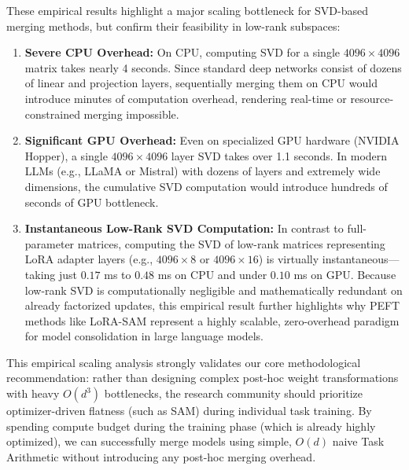 \documentclass{article}
\theoremstyle{plain}
\theoremstyle{definition}
\theoremstyle{remark}
\begin{document}
These empirical results highlight a major scaling bottleneck for SVD-based merging methods, but confirm their feasibility in low-rank subspaces:
\begin{enumerate}
  \item \textbf{Severe CPU Overhead:} On CPU, computing SVD for a single $4096 \times 4096$ matrix takes nearly 4 seconds. Since standard deep networks consist of dozens of linear and projection layers, sequentially merging them on CPU would introduce minutes of computation overhead, rendering real-time or resource-constrained merging impossible.
  \item \textbf{Significant GPU Overhead:} Even on specialized GPU hardware (NVIDIA Hopper), a single $4096 \times 4096$ layer SVD takes over 1.1 seconds. In modern LLMs (e.g., LLaMA or Mistral) with dozens of layers and extremely wide dimensions, the cumulative SVD computation would introduce hundreds of seconds of GPU bottleneck.
  \item \textbf{Instantaneous Low-Rank SVD Computation:} In contrast to full-parameter matrices, computing the SVD of low-rank matrices representing LoRA adapter layers (e.g., $4096 \times 8$ or $4096 \times 16$) is virtually instantaneous—taking just $0.17$ ms to $0.48$ ms on CPU and under $0.10$ ms on GPU. Because low-rank SVD is computationally negligible and mathematically redundant on already factorized updates, this empirical result further highlights why PEFT methods like LoRA-SAM represent a highly scalable, zero-overhead paradigm for model consolidation in large language models.
\end{enumerate}
This empirical scaling analysis strongly validates our core methodological recommendation: rather than designing complex post-hoc weight transformations with heavy $O(d^3)$ bottlenecks, the research community should prioritize optimizer-driven flatness (such as SAM) during individual task training. By spending compute budget during the training phase (which is already highly optimized), we can successfully merge models using simple, $O(d)$ naive Task Arithmetic without introducing any post-hoc merging overhead.
\end{document}
